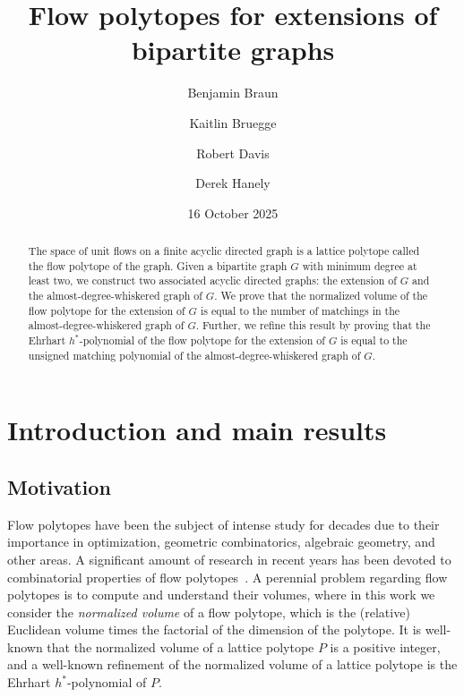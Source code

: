 \documentclass[12pt]{amsart}
\title{Flow polytopes for extensions of bipartite graphs}
\author[Braun]{Benjamin Braun}
\author[Bruegge]{Kaitlin Bruegge}
\author[Davis]{Robert Davis}
\author[Hanely]{Derek Hanely}
\date{16 October 2025}
\theoremstyle{definition}
\begin{document}
\begin{abstract}
The space of unit flows on a finite acyclic directed graph is a lattice polytope called the flow polytope of the graph.
Given a bipartite graph $G$ with minimum degree at least two, we construct two associated acyclic directed graphs: the extension of $G$ and the almost-degree-whiskered graph of $G$.
We prove that the normalized volume of the flow polytope for the extension of $G$ is equal to the number of matchings in the almost-degree-whiskered graph of $G$.
Further, we refine this result by proving that the Ehrhart $h^*$-polynomial of the flow polytope for the extension of $G$ is equal to the unsigned matching polynomial of the almost-degree-whiskered graph of $G$.
\end{abstract}

\maketitle

\section{Introduction and main results}

\subsection{Motivation}

Flow polytopes have been the subject of intense study for decades due to their importance in optimization, geometric combinatorics, algebraic geometry, and other areas.
A significant amount of research in recent years has been devoted to combinatorial properties of flow polytopes~\cite{baldoni-vergne,vonbell2024triangulations,framedtriangulations,caracolvolume,combflowmodel,braun2024equatorialflowtriangulationsgorenstein,braunmcelroyfullvolumes,DKK,generalpitmanstanley,cyclicorderflow,integerpointsflow,lidskii,gtflow,flowdiagonalharmonics,meszaros-morales,meszaros-morales-striker,morrisidentityflow,rietsch2024rootpolytopesflowpolytopes}.
A perennial problem regarding flow polytopes is to compute and understand their volumes, where in this work we consider the \emph{normalized volume} of a flow polytope, which is the (relative) Euclidean volume times the factorial of the dimension of the polytope.
It is well-known that the normalized volume of a lattice polytope $P$ is a positive integer, and a well-known refinement of the normalized volume of a lattice polytope is the Ehrhart $h^*$-polynomial of $P$.
\end{document}
